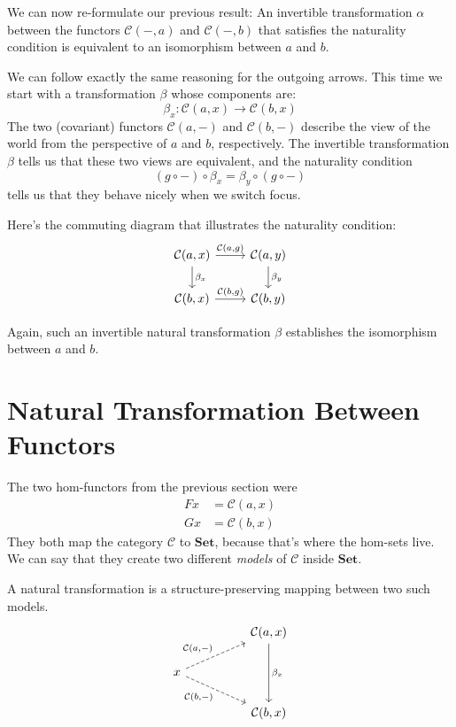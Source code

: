 \documentclass[DaoFP]{subfiles}
\begin{document}
We can now re-formulate our previous result:  An invertible transformation $\alpha$ between the functors $\mathcal{C}(-, a)$ and $\mathcal{C}(-, b)$ that satisfies the naturality condition is equivalent to an isomorphism between $a$ and $b$.

We can follow exactly the same reasoning for the outgoing arrows. This time we start with a transformation $\beta$ whose components are:
\[ \beta_x \colon \mathcal{C}(a, x) \to \mathcal{C}(b, x) \]
The two (covariant) functors $\mathcal{C}(a, -)$ and $\mathcal{C}(b, -)$ describe the view of the world from the perspective of $a$ and $b$, respectively. The invertible transformation $\beta$ tells us that these two views are equivalent, and the naturality condition 
\[ (g \circ -) \circ \beta_x = \beta_y \circ (g \circ -) \]
tells us that they behave nicely when we switch focus.

Here's the commuting diagram that illustrates the naturality condition:
\[
 \begin{tikzcd}
 \mathcal{C}(a, x)
 \arrow[d, "\beta_x"]
 \arrow[r, "{\mathcal{C}(a, g)}"]
 &
 \mathcal{C}(a, y)
  \arrow[d, "\beta_y"]
 \\
 \mathcal{C}(b, x)
 \arrow[r, "{\mathcal{C}(b, g)}"]
& \mathcal{C}(b, y)
 \end{tikzcd}
\]

Again, such an invertible natural transformation $\beta$ establishes the isomorphism between $a$ and $b$.

\section{Natural Transformation Between Functors}

The two hom-functors from the previous section were
\begin{align*}
 F x &=   \mathcal{C}(a, x) \\
G x &=   \mathcal{C}(b, x)
\end{align*}
They both map the category $\mathcal{C}$ to  $\mathbf{Set}$, because that's where the hom-sets live. We can say that they create two different \emph{models} of $\mathcal{C}$ inside $\mathbf{Set}$. 

A natural transformation is a structure-preserving mapping between two such models. 
\[
 \begin{tikzcd}
 && \cat C(a, x)
 \arrow[dd, "\beta_x"]
 \\
 x
 \arrow[rru, dashed, "{\cat C(a, -)}"]
 \arrow[rrd, dashed, "{\cat C(b, -)}"']
 \\
 && \cat C(b, x)
 \end{tikzcd}
\]
\end{document}
